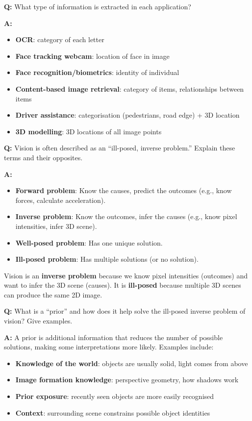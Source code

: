 \begin{exbox}
\textbf{Q:} What type of information is extracted in each application?

\textbf{A:}
\begin{itemize}
  \item \textbf{OCR}: category of each letter
  \item \textbf{Face tracking webcam}: location of face in image
  \item \textbf{Face recognition/biometrics}: identity of individual
  \item \textbf{Content-based image retrieval}: category of items, relationships between items
  \item \textbf{Driver assistance}: categorisation (pedestrians, road edge) + 3D location
  \item \textbf{3D modelling}: 3D locations of all image points
\end{itemize}
\end{exbox}

\begin{exbox}
\textbf{Q:} Vision is often described as an ``ill-posed, inverse problem.'' Explain these terms and their opposites.

\textbf{A:}
\begin{itemize}
  \item \textbf{Forward problem}: Know the causes, predict the outcomes (e.g., know forces, calculate acceleration).
  \item \textbf{Inverse problem}: Know the outcomes, infer the causes (e.g., know pixel intensities, infer 3D scene).
  \item \textbf{Well-posed problem}: Has one unique solution.
  \item \textbf{Ill-posed problem}: Has multiple solutions (or no solution).
\end{itemize}
Vision is an \textbf{inverse problem} because we know pixel intensities (outcomes) and want to infer the 3D scene (causes). It is \textbf{ill-posed} because multiple 3D scenes can produce the same 2D image.
\end{exbox}

\begin{exbox}
\textbf{Q:} What is a ``prior'' and how does it help solve the ill-posed inverse problem of vision? Give examples.

\textbf{A:} A prior is additional information that reduces the number of possible solutions, making some interpretations more likely. Examples include:
\begin{itemize}
  \item \textbf{Knowledge of the world}: objects are usually solid, light comes from above
  \item \textbf{Image formation knowledge}: perspective geometry, how shadows work
  \item \textbf{Prior exposure}: recently seen objects are more easily recognised
  \item \textbf{Context}: surrounding scene constrains possible object identities
\end{itemize}
\end{exbox}

